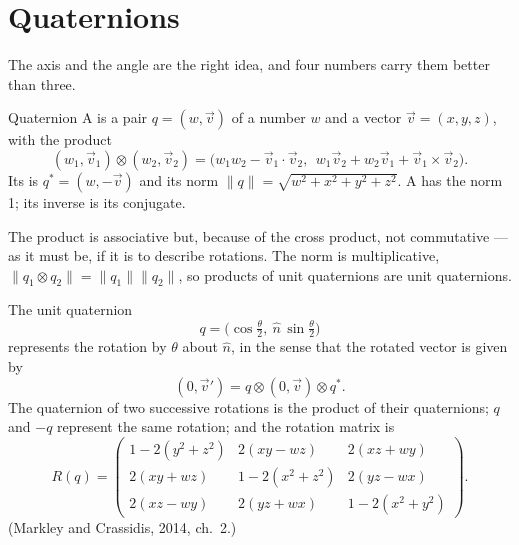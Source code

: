 \section{Quaternions}

The axis and the angle are the right idea, and four numbers carry them better than three.

\begin{definition}{Quaternion}
A  is a pair $q = (w, \vec v)$ of a number $w$ and a vector $\vec v = (x, y, z)$, with the product
\begin{equation}\label{eq:H-product}
  (w_1, \vec v_1) \otimes (w_2, \vec v_2) = \big(w_1w_2 - \vec v_1 \cdot \vec v_2,\ \ w_1\vec v_2 + w_2\vec v_1 + \vec v_1 \times \vec v_2\big) .
\end{equation}
Its  is $q^* = (w, -\vec v)$ and its norm $\|q\| = \sqrt{w^2 + x^2 + y^2 + z^2}$. A  has the norm 1; its inverse is its conjugate.
\end{definition}

The product is associative but, because of the cross product, not commutative — as it must be, if it is to describe rotations. The norm is multiplicative, $\|q_1 \otimes q_2\| = \|q_1\|\|q_2\|$, so products of unit quaternions are unit quaternions.

\begin{theorem}
\label{thm:H-quat}
The unit quaternion
\begin{equation}\label{eq:H-q}
  q = \big(\cos\tfrac\theta2,\ \hat n\,\sin\tfrac\theta2\big)
\end{equation}
represents the rotation by $\theta$ about $\hat n$, in the sense that the rotated vector is given by
\begin{equation}\label{eq:H-sandwich}
  (0, \vec v') = q \otimes (0, \vec v) \otimes q^* .
\end{equation}
The quaternion of two successive rotations is the product of their quaternions; $q$ and $-q$ represent the same rotation; and the rotation matrix is
\begin{equation}\label{eq:H-Rq}
  R(q) = \begin{pmatrix}
    1 - 2(y^2 + z^2) & 2(xy - wz) & 2(xz + wy)\\
    2(xy + wz) & 1 - 2(x^2 + z^2) & 2(yz - wx)\\
    2(xz - wy) & 2(yz + wx) & 1 - 2(x^2 + y^2)
  \end{pmatrix} .
\end{equation}
(Markley and Crassidis, 2014, ch.~2.)
\end{theorem}

